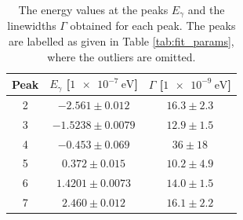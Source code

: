 \documentclass[a4paper]{report}
\numberwithin{equation}{section}
\begin{document}

\begin{table}[!ht]
    \centering
    \begin{tabular}{|c|c|c|}
    \hline  
        Peak & $E_\gamma$ [$\SI{1e-7}{\electronvolt}$] & $\Gamma$ [$\SI{1e-9}{\electronvolt}$] \\ \hline
        2 &$-2.561 \pm 0.012$ &   $16.3 \pm 2.3$ \\ \hline
        3 &$-1.5238 \pm 0.0079$ & $12.9 \pm 1.5$ \\ \hline
        4 &$-0.453 \pm 0.069$ &   $36 \pm 18 $ \\ \hline
        5 &$ 0.372 \pm 0.015$ &   $10.2 \pm 4.9$ \\ \hline
        6 &$ 1.4201 \pm 0.0073$ & $14.0 \pm 1.5$ \\ \hline
        7 &$ 2.460 \pm 0.012$ &   $16.1 \pm 2.2$ \\ \hline
    \end{tabular}
    \caption{The energy values at the peaks $E_\gamma$ and the linewidths $\Gamma$ obtained for each peak. The peaks are 
    labelled as given in Table \ref{tab:fit_params}, where the outliers are omitted.}
\label{tab:energy_params}
\end{table}
\end{document}
